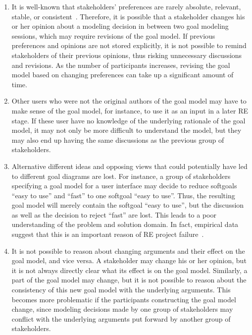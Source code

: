 \documentclass[11.5pt,two column]{llncs}
\begin{document}
\begin{enumerate}
\item
It is well-known that stakeholders' preferences are rarely absolute, relevant, stable, or consistent~\cite{march1978bounded}. Therefore, it is possible that a stakeholder changes his or her opinion about a modeling decision in between two goal modeling sessions, which may require revisions of the goal model. If previous preferences and opinions are not stored explicitly, it is not possible to remind stakeholders of their previous opinions, thus risking unnecessary discussions and revisions. As the number of participants increases, revising the goal model based on changing preferences can take up a significant amount of time.
\item
Other users who were not the original authors of the goal model may have to make sense of the goal model, for instance, to use it as an input in a later RE stage. If these user have no knowledge of the underlying rationale of the goal model, it may not only be more difficult to understand the model, but they may also end up having the same discussions as the previous group of stakeholders.
\item
Alternative different ideas and opposing views that could potentially have led to different goal diagrams are lost. For instance, a group of stakeholders specifying a goal model for a user interface may decide to reduce softgoals ``easy to use'' and ``fast'' to one softgoal ``easy to use''. Thus, the resulting goal model will merely contain the softgoal ``easy to use'', but the discussion as well as the decision to reject ``fast'' are lost. This leads to a poor understanding of the problem and solution domain. In fact, empirical data suggest that this is an important reason of RE project failure~\cite{curtis1988field}. 
\item
It is not possible to reason about changing arguments and their effect on the goal model, and vice versa. A stakeholder may change his or her opinion, but it is not always directly clear what its effect is on the goal model. Similarly, a part of the goal model may change, but it is not possible to reason about the consistency of this new goal model with the underlying arguments. This becomes more problematic if the participants constructing the goal model change, since modeling decisions made by one group of stakeholders may conflict with the underlying arguments put forward by another group of stakeholders.
\end{enumerate}
 
\end{document}
